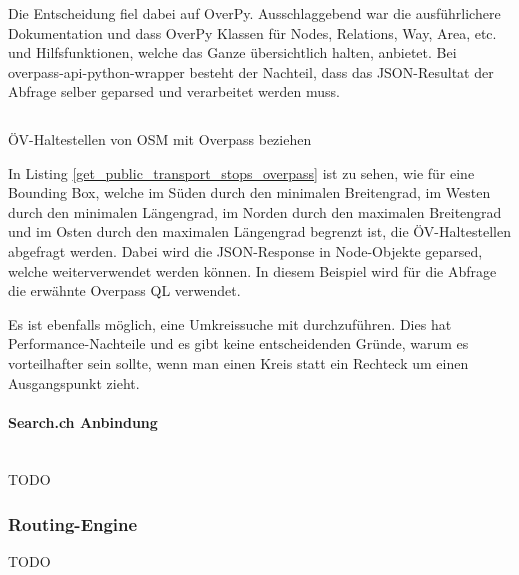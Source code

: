 Die Entscheidung fiel dabei auf OverPy. Ausschlaggebend war die ausführlichere Dokumentation und dass OverPy Klassen für Nodes, Relations, Way, Area, etc. und Hilfsfunktionen, welche das Ganze übersichtlich halten, anbietet. Bei overpass-api-python-wrapper besteht der Nachteil, dass das JSON-Resultat der Abfrage selber geparsed und verarbeitet werden muss.

\begin{listing}[ht]
    \inputminted{python}{projectdoc/listing/get_public_transport_stops_overpass.py}
    \caption{ÖV-Haltestellen von \acs{OSM} mit Overpass beziehen}
    \label{get_public_transport_stops_overpass}
\end{listing}

In Listing \ref{get_public_transport_stops_overpass} ist zu sehen, wie für eine Bounding Box, welche im Süden durch den minimalen Breitengrad, im Westen durch den minimalen Längengrad, im Norden durch den maximalen Breitengrad und im Osten durch den maximalen Längengrad begrenzt ist, die ÖV-Haltestellen abgefragt werden. Dabei wird die JSON-Response in Node-Objekte geparsed, welche weiterverwendet werden können. In diesem Beispiel wird für die Abfrage die erwähnte Overpass QL verwendet.

Es ist ebenfalls möglich, eine Umkreissuche mit  durchzuführen. Dies hat Performance-Nachteile und es gibt keine entscheidenden Gründe, warum es vorteilhafter sein sollte, wenn man einen Kreis statt ein Rechteck um einen Ausgangspunkt zieht.

\paragraph{Search.ch Anbindung}\label{architektur:Search.ch Anbindung}~\\

TODO

\subsubsection{Routing-Engine}
\label{architektur:Routing-Engine}

TODO
